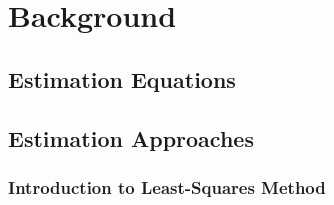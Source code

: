 \documentclass[/home/francois/latex/report/main.tex]{subfiles}
\begin{document}
\chapter{Background}

\section{Estimation Equations}


\section{Estimation Approaches}

\subsection{Introduction to Least-Squares Method}
\end{document}
